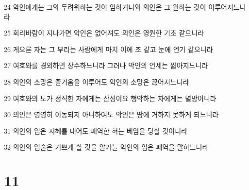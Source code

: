 \par 24 악인에게는 그의 두려워하는 것이 임하거니와 의인은 그 원하는 것이 이루어지느니라
\par 25 회리바람이 지나가면 악인은 없어져도 의인은 영원한 기초 같으니라
\par 26 게으른 자는 그 부리는 사람에게 마치 이에 초 같고 눈에 연기 같으니라
\par 27 여호와를 경외하면 장수하느니라 그러나 악인의 연세는 짧아지느니라
\par 28 의인의 소망은 즐거움을 이루어도 악인의 소망은 끊어지느니라
\par 29 여호와의 도가 정직한 자에게는 산성이요 행악하는 자에게는 멸망이니라
\par 30 의인은 영영히 이동되지 아니하여도 악인은 땅에 거하지 못하게 되느니라
\par 31 의인의 입은 지혜를 내어도 패역한 혀는 베임을 당할 것이니라
\par 32 의인의 입술은 기쁘게 할 것을 알거늘 악인의 입은 패역을 말하느니라

\chapter{11}

